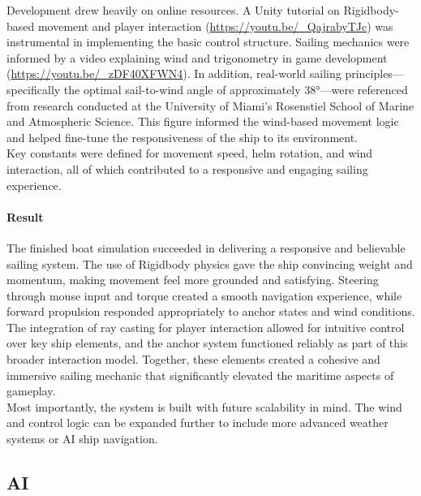 \documentclass{article}
\begin{document}
Development drew heavily on online resources. A Unity tutorial on Rigidbody-based movement and player interaction (\url{https://youtu.be/_QajrabyTJc}) was instrumental in implementing the basic control structure. Sailing mechanics were informed by a video explaining wind and trigonometry in game development (\url{https://youtu.be/_zDF40XFWN4}). In addition, real-world sailing principles—specifically the optimal sail-to-wind angle of approximately 38°—were referenced from research conducted at the University of Miami's Rosenstiel School of Marine and Atmospheric Science. This figure informed the wind-based movement logic and helped fine-tune the responsiveness of the ship to its environment.\\

Key constants were defined for movement speed, helm rotation, and wind interaction, all of which contributed to a responsive and engaging sailing experience.

\paragraph{Result}\hfill

The finished boat simulation succeeded in delivering a responsive and believable sailing system. The use of Rigidbody physics gave the ship convincing weight and momentum, making movement feel more grounded and satisfying. Steering through mouse input and torque created a smooth navigation experience, while forward propulsion responded appropriately to anchor states and wind conditions.\\

The integration of ray casting for player interaction allowed for intuitive control over key ship elements, and the anchor system functioned reliably as part of this broader interaction model. Together, these elements created a cohesive and immersive sailing mechanic that significantly elevated the maritime aspects of gameplay.\\

Most importantly, the system is built with future scalability in mind. The wind and control logic can be expanded further to include more advanced weather systems or AI ship navigation.










\newpage
\subsection{AI}
\end{document}
